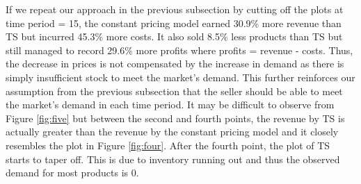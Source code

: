 \documentclass[a4paper]{article}
\begin{document}
If we repeat our approach in the previous subsection by cutting off the plots at time period = 15, the constant pricing model earned 30.9\% more revenue than TS but incurred 45.3\% more costs. It also sold 8.5\% less products than TS but still managed to record 29.6\% more profits where profits = revenue - costs. Thus, the decrease in prices is not compensated by the increase in demand as there is simply insufficient stock to meet the market's demand. This further reinforces our assumption from the previous subsection that the seller should be able to meet the market's demand in each time period. It may be difficult to observe from Figure \ref{fig:five} but between the second and fourth points, the revenue by TS is actually greater than the revenue by the constant pricing model and it closely resembles the plot in Figure \ref{fig:four}. After the fourth point, the plot of TS starts to taper off. This is due to inventory running out and thus the observed demand for most products is 0.
\end{document}
